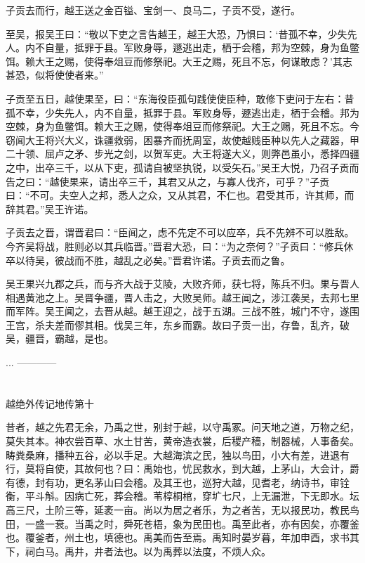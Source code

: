\documentclass[12pt,UTF8]{ctexbook}
\begin{document}
子贡去而行，越王送之金百镒、宝剑一、良马二，子贡不受，遂行。

至吴，报吴王曰：“敬以下吏之言告越王，越王大恐，乃惧曰：‘昔孤不幸，少失先人。内不自量，抵罪于县。军败身辱，遯逃出走，栖于会稽，邦为空棘，身为鱼鳖饵。赖大王之赐，使得奉俎豆而修祭祀。大王之赐，死且不忘，何谋敢虑？’其志甚恐，似将使使者来。”

子贡至五日，越使果至，曰：“东海役臣孤句践使使臣种，敢修下吏问于左右：昔孤不幸，少失先人，内不自量，抵罪于县。军败身辱，遯逃出走，栖于会稽。邦为空棘，身为鱼鳖饵。赖大王之赐，使得奉俎豆而修祭祀。大王之赐，死且不忘。今窃闻大王将兴大义，诛疆救弱，困暴齐而抚周室，故使越贱臣种以先人之藏器，甲二十领、屈卢之矛、步光之剑，以贺军吏。大王将遂大义，则弊邑虽小，悉择四疆之中，出卒三千，以从下吏，孤请自被坚执锐，以受矢石。”吴王大悦，乃召子贡而告之曰：“越使果来，请出卒三千，其君又从之，与寡人伐齐，可乎？”子贡曰：“不可。夫空人之邦，悉人之众，又从其君，不仁也。君受其币，许其师，而辞其君。”吴王许诺。

子贡去之晋，谓晋君曰：“臣闻之，虑不先定不可以应卒，兵不先辨不可以胜敌。今齐吴将战，胜则必以其兵临晋。”晋君大恐，曰：“为之奈何？”子贡曰：“修兵休卒以待吴，彼战而不胜，越乱之必矣。”晋君许诺。子贡去而之鲁。

吴王果兴九郡之兵，而与齐大战于艾陵，大败齐师，获七将，陈兵不归。果与晋人相遇黄池之上。吴晋争疆，晋人击之，大败吴师。越王闻之，涉江袭吴，去邦七里而军阵。吴王闻之，去晋从越。越王迎之，战于五湖。三战不胜，城门不守，遂围王宫，杀夫差而僇其相。伐吴三年，东乡而霸。故曰子贡一出，存鲁，乱齐，破吴，疆晋，霸越，是也。

...
------------

\part{}

越绝外传记地传第十

昔者，越之先君无余，乃禹之世，别封于越，以守禹冢。问天地之道，万物之纪，莫失其本。神农尝百草、水土甘苦，黄帝造衣裳，后稷产穑，制器械，人事备矣。畴粪桑麻，播种五谷，必以手足。大越海滨之民，独以鸟田，小大有差，进退有行，莫将自使，其故何也？曰：禹始也，忧民救水，到大越，上茅山，大会计，爵有德，封有功，更名茅山曰会稽。及其王也，巡狩大越，见耆老，纳诗书，审铨衡，平斗斛。因病亡死，葬会稽。苇椁桐棺，穿圹七尺，上无漏泄，下无即水。坛高三尺，土阶三等，延袤一亩。尚以为居之者乐，为之者苦，无以报民功，教民鸟田，一盛一衰。当禹之时，舜死苍梧，象为民田也。禹至此者，亦有因矣，亦覆釜也。覆釜者，州土也，填德也。禹美而告至焉。禹知时晏岁暮，年加申酉，求书其下，祠白马。禹井，井者法也。以为禹葬以法度，不烦人众。
\end{document}
